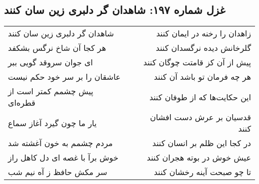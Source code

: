 \begin{center}
\section*{غزل شماره ۱۹۷: شاهدان گر دلبری زین سان کنند}
\label{sec:sh197}
\begin{longtable}{l p{0.5cm} r}
شاهدان گر دلبری زین سان کنند
&&
زاهدان را رخنه در ایمان کنند
\\
هر کجا آن شاخ نرگس بشکفد
&&
گلرخانش دیده نرگسدان کنند
\\
ای جوان سروقد گویی ببر
&&
پیش از آن کز قامتت چوگان کنند
\\
عاشقان را بر سر خود حکم نیست
&&
هر چه فرمان تو باشد آن کنند
\\
پیش چشمم کمتر است از قطره‌ای
&&
این حکایت‌ها که از طوفان کنند
\\
یار ما چون گیرد آغاز سماع
&&
قدسیان بر عرش دست افشان کنند
\\
مردم چشمم به خون آغشته شد
&&
در کجا این ظلم بر انسان کنند
\\
خوش برآ با غصه ای دل کاهل راز
&&
عیش خوش در بوته هجران کنند
\\
سر مکش حافظ ز آه نیم شب
&&
تا چو صبحت آینه رخشان کنند
\\
\end{longtable}
\end{center}
